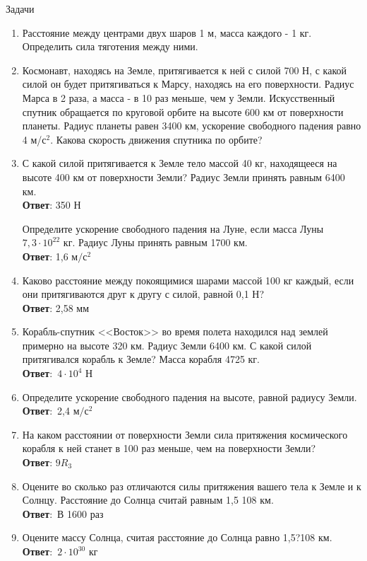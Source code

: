 \documentclass[a5paper, 10pt]{diss_4}
\renewcommand{\'}{\,'}
\begin{document}
\begin{center}
   Задачи
\end{center}
\begin{enumerate}

  \item Расстояние между центрами двух шаров 1 м, масса каждого - 1 кг.
Определить сила тяготения между ними.

  \item Космонавт, находясь на Земле, притягивается к ней с силой 700 Н, с какой
 силой он будет притягиваться к Марсу, находясь на его поверхности. Радиус
Марса в 2 раза, а масса - в 10 раз меньше, чем у Земли. Искусственный спутник
 обращается по круговой орбите на высоте 600 км от поверхности планеты. Радиус
 планеты равен 3400 км, ускорение свободного падения равно 4 м/$с^2$. Какова
скорость движения спутника по орбите?

  \item С какой силой притягивается к Земле тело массой 40 кг, находящееся на
высоте 400 км от поверхности Земли? Радиус Земли принять равным 6400 км.
\\\textbf{Ответ}: 350 Н

  Определите ускорение свободного падения на Луне, если масса Луны
$7,3\cdot10^{22}$ кг. Радиус Луны принять равным 1700 км.\\\textbf{Ответ}: 1,6
$м/с^2$

  \item Каково расстояние между покоящимися шарами массой 100 кг каждый, если
они притягиваются друг к другу с силой, равной 0,1 Н?\\\textbf{Ответ}: 2,58 мм

  \item Корабль-спутник <<Восток>> во время полета находился над землей примерно
на высоте 320 км. Радиус Земли 6400 км. С какой силой притягивался корабль к
 Земле? Масса корабля 4725 кг.\\\textbf{Ответ}:\ $4\cdot10^4$ Н

  \item Определите ускорение свободного падения на высоте, равной радиусу Земли.
 \\\textbf{Ответ}:\ 2,4 $м/с^2$

  \item На каком расстоянии от поверхности Земли сила притяжения космического
корабля к ней станет в 100 раз меньше, чем на поверхности
Земли?\\\textbf{Ответ}: $9R_3$

  \item Оцените во сколько раз отличаются силы притяжения вашего тела к Земле и
к Солнцу. Расстояние до Солнца считай равным 1,5 108 км.\\\textbf{Ответ}:\ В
1600 раз

  \item Оцените массу Солнца, считая расстояние до Солнца равно 1,5?108 км.
\\\textbf{Ответ}:\ $2\cdot10^{30}$ кг

\end{enumerate}
\end{document}
